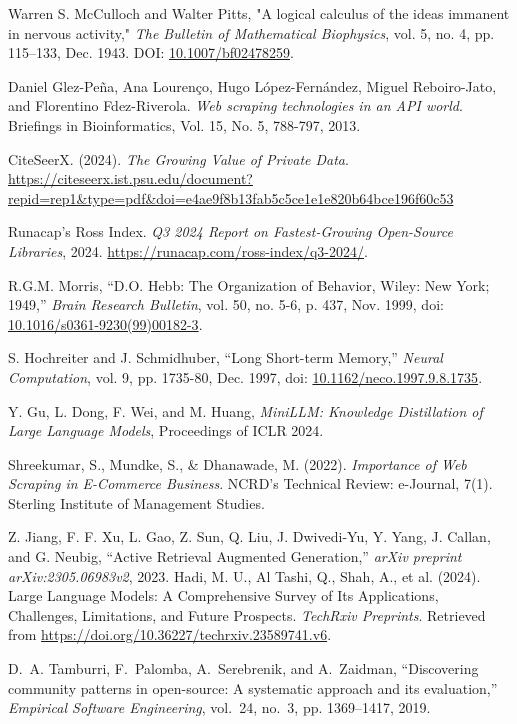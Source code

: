 \documentclass[english,master]{unibg}
\begin{document}
\begin{thebibliography}{1}
Warren S. McCulloch and Walter Pitts, 
"A logical calculus of the ideas immanent in nervous activity," 
\textit{The Bulletin of Mathematical Biophysics}, 
vol. 5, no. 4, pp. 115--133, Dec. 1943. 
DOI: \href{https://doi.org/10.1007/bf02478259}{10.1007/bf02478259}.

Daniel Glez-Peña, Ana Lourenço, Hugo López-Fernández, Miguel Reboiro-Jato, and Florentino Fdez-Riverola. 
\textit{Web scraping technologies in an API world}. Briefings in Bioinformatics, Vol. 15, No. 5, 788-797, 2013.

CiteSeerX. (2024). \textit{The Growing Value of Private Data}. \url{https://citeseerx.ist.psu.edu/document?repid=rep1&type=pdf&doi=e4ae9f8b13fab5c5ce1e1e820b64bce196f60c53}

Runacap's Ross Index. \emph{Q3 2024 Report on Fastest-Growing Open-Source Libraries}, 2024. \url{https://runacap.com/ross-index/q3-2024/}.


R.G.M. Morris, ``D.O. Hebb: The Organization of Behavior, Wiley: New York; 1949,'' \textit{Brain Research Bulletin}, vol. 50, no. 5-6, p. 437, Nov. 1999, doi: \href{https://doi.org/10.1016/s0361-9230(99)00182-3}{10.1016/s0361-9230(99)00182-3}.

S. Hochreiter and J. Schmidhuber, ``Long Short-term Memory,'' \textit{Neural Computation}, vol. 9, pp. 1735-80, Dec. 1997, doi: \href{https://doi.org/10.1162/neco.1997.9.8.1735}{10.1162/neco.1997.9.8.1735}.

Y. Gu, L. Dong, F. Wei, and M. Huang, 
\textit{MiniLLM: Knowledge Distillation of Large Language Models}, 
Proceedings of ICLR 2024.
    
Shreekumar, S., Mundke, S., \& Dhanawade, M. (2022). \textit{Importance of Web Scraping in E-Commerce Business}. NCRD’s Technical Review: e-Journal, 7(1). Sterling Institute of Management Studies.


    Z. Jiang, F. F. Xu, L. Gao, Z. Sun, Q. Liu, J. Dwivedi-Yu, Y. Yang, J. Callan, and G. Neubig, ``Active Retrieval Augmented Generation,'' \emph{arXiv preprint arXiv:2305.06983v2}, 2023.
Hadi, M. U., Al Tashi, Q., Shah, A., et al. (2024). Large Language Models: A Comprehensive Survey of Its Applications, Challenges, Limitations, and Future Prospects. \textit{TechRxiv Preprints}. Retrieved from \url{https://doi.org/10.36227/techrxiv.23589741.v6}.




D.~A. Tamburri, F.~Palomba, A.~Serebrenik, and A.~Zaidman, ``Discovering community patterns in open-source: A systematic approach and its evaluation,'' \emph{Empirical Software Engineering}, vol.~24, no.~3, pp. 1369–1417, 2019.


\end{thebibliography}
\end{document}
